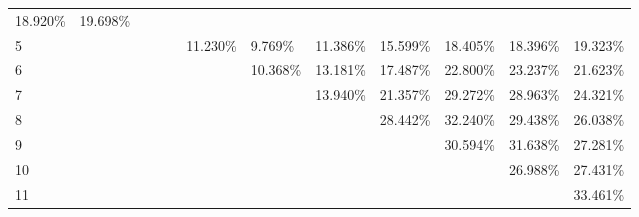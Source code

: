 \documentclass{article}
\begin{document}
\begin{table}[h!]
{\begin{tabular}{llllllllllll}
  \cellcolor[HTML]{FED17F}18.920\% &
  \cellcolor[HTML]{FECB7E}19.698\% \\
\multicolumn{1}{l|}{5} &
   &
   &
   &
   &
  \cellcolor[HTML]{C8DB80}11.230\% &
  \cellcolor[HTML]{B4D57F}9.769\% &
  \cellcolor[HTML]{CADB80}11.386\% &
  \cellcolor[HTML]{FFE884}15.599\% &
  \cellcolor[HTML]{FED480}18.405\% &
  \cellcolor[HTML]{FED480}18.396\% &
  \cellcolor[HTML]{FECE7F}19.323\% \\
\multicolumn{1}{l|}{6} &
   &
   &
   &
   &
   &
  \cellcolor[HTML]{BCD780}10.368\% &
  \cellcolor[HTML]{E4E382}13.181\% &
  \cellcolor[HTML]{FFDB81}17.487\% &
  \cellcolor[HTML]{FDB57A}22.800\% &
  \cellcolor[HTML]{FCB279}23.237\% &
  \cellcolor[HTML]{FDBD7C}21.623\% \\
\multicolumn{1}{l|}{7} &
   &
   &
   &
   &
   &
   &
  \cellcolor[HTML]{EEE683}13.940\% &
  \cellcolor[HTML]{FDBF7C}21.357\% &
  \cellcolor[HTML]{FA8771}29.272\% &
  \cellcolor[HTML]{FA8972}28.963\% &
  \cellcolor[HTML]{FCAA78}24.321\% \\
\multicolumn{1}{l|}{8} &
   &
   &
   &
   &
   &
   &
   &
  \cellcolor[HTML]{FA8D72}28.442\% &
  \cellcolor[HTML]{F9726D}32.240\% &
  \cellcolor[HTML]{FA8671}29.438\% &
  \cellcolor[HTML]{FB9E76}26.038\% \\
\multicolumn{1}{l|}{9} &
   &
   &
   &
   &
   &
   &
   &
   &
  \cellcolor[HTML]{FA7E6F}30.594\% &
  \cellcolor[HTML]{F9766E}31.638\% &
  \cellcolor[HTML]{FB9574}27.281\% \\
\multicolumn{1}{l|}{10} &
   &
   &
   &
   &
   &
   &
   &
   &
   &
  \cellcolor[HTML]{FB9774}26.988\% &
  \cellcolor[HTML]{FB9474}27.431\% \\
\multicolumn{1}{l|}{11} &
   &
   &
   &
   &
   &
   &
   &
   &
   &
   &
  \cellcolor[HTML]{F8696B}33.461\%
\end{tabular}%
}
\end{table}
\end{document}

